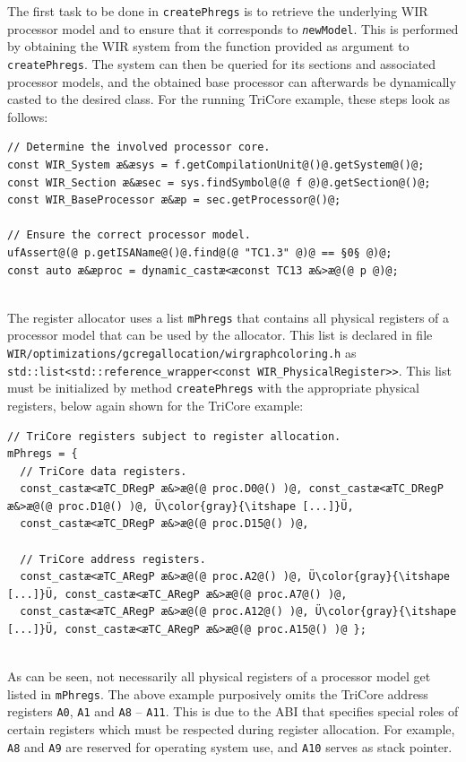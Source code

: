 The first task to be done in \texttt{createPhregs} is to retrieve the underlying \gls{WIR} processor model and to ensure that it corresponds to \texttt{\emph newModel}.
This is performed by obtaining the \gls{WIR} system from the function provided as argument to \texttt{createPhregs}.
The system can then be queried for its sections and associated processor models, and the obtained base processor can afterwards be dynamically casted to the desired class.
For the running TriCore example, these steps look as follows: \\
\begin{lstlisting}[style=code,float=!ht,aboveskip=-0.8 \baselineskip,belowskip=-0.8 \baselineskip]
// Determine the involved processor core.
const WIR_System æ&æsys = f.getCompilationUnit@()@.getSystem@()@;
const WIR_Section æ&æsec = sys.findSymbol@(@ f @)@.getSection@()@;
const WIR_BaseProcessor æ&æp = sec.getProcessor@()@;

// Ensure the correct processor model.
ufAssert@(@ p.getISAName@()@.find@(@ "TC1.3" @)@ == §0§ @)@;
const auto æ&æproc = dynamic_castæ<æconst TC13 æ&>æ@(@ p @)@;
\end{lstlisting}
\\
The register allocator uses a list \texttt{mPhregs} that contains all physical registers of a processor model that can be used by the allocator.
This list is declared in file \texttt{WIR/optimizations/gcregallocation/wirgraphcoloring.h} as \texttt{std::list<std::reference\_wrapper<const WIR\_PhysicalRegister>{}>}.
This list must be initialized by method \texttt{createPhregs} with the appropriate physical registers, below again shown for the TriCore example: \\
\begin{lstlisting}[style=code,float=!ht,aboveskip=-0.8 \baselineskip,belowskip=-0.8 \baselineskip]
// TriCore registers subject to register allocation.
mPhregs = {
  // TriCore data registers.
  const_castæ<æTC_DRegP æ&>æ@(@ proc.D0@() )@, const_castæ<æTC_DRegP æ&>æ@(@ proc.D1@() )@, Ü\color{gray}{\itshape [...]}Ü,
  const_castæ<æTC_DRegP æ&>æ@(@ proc.D15@() )@,

  // TriCore address registers.
  const_castæ<æTC_ARegP æ&>æ@(@ proc.A2@() )@, Ü\color{gray}{\itshape [...]}Ü, const_castæ<æTC_ARegP æ&>æ@(@ proc.A7@() )@,
  const_castæ<æTC_ARegP æ&>æ@(@ proc.A12@() )@, Ü\color{gray}{\itshape [...]}Ü, const_castæ<æTC_ARegP æ&>æ@(@ proc.A15@() )@ };
\end{lstlisting}
\\
As can be seen, not necessarily all physical registers of a processor model get listed in \texttt{mPhregs}.
The above example purposively omits the TriCore address registers \texttt{A0}, \texttt{A1} and \texttt{A8} -- \texttt{A11}.
This is due to the \gls{ABI} that specifies special roles of certain registers which must be respected during register allocation.
For example, \texttt{A8} and \texttt{A9} are reserved for operating system use, and \texttt{A10} serves as stack pointer.

